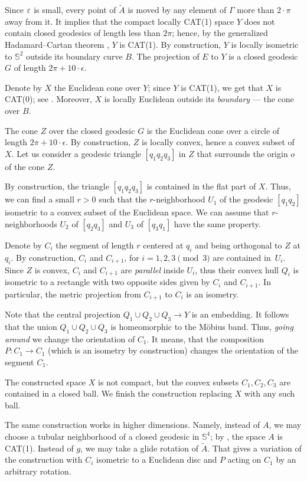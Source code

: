\documentclass[a4paper,10pt]{article}
\begin{document}
Since $\varepsilon$ is small, every point of $\tilde A$ is moved by any element of $\Gamma$ more than $2\cdot\pi$ away from it.
It implies that the compact locally CAT(1) space $Y$ does not contain closed geodesics of length less than $2\pi$;
hence, by  the generalized Hadamard--Cartan theorem \cite{AKP}, $Y$ is CAT(1).
By construction, $Y$ is locally isometric to $\mathbb{S}^2$ outside its boundary curve $B$.
The projection of $E$ to $Y$ is a closed geodesic $G$ of length $2\pi +10\cdot\epsilon$.

Denote by $X$ the Euclidean cone over $Y$;
since $Y$ is CAT(1), we get that $X$ is CAT(0); see \cite{AKP}.
Moreover, $X$ is locally Euclidean outside its \emph{boundary} --- the cone over $B$.

The cone $Z$ over the closed geodesic $G$ is  the Euclidean cone over a circle of length $2\pi +10\cdot\epsilon$. By construction,
$Z$ is locally convex, hence a convex subset of~$X$.
Let us consider a geodesic triangle
$[q_1q_2q_3]$
in $Z$ that surrounds the origin $o$ of the cone $Z$.

By construction, the triangle $[q_1q_2q_3]$ is contained in the flat part of $X$.
Thus, we can find a small $r>0$ such that the $r$-neighborhood $U_1$ of the geodesic $[q_1q_2]$ isometric to a convex subset of the Euclidean space.
We can assume that $r$-neighborhoods $U_2$ of $[q_2q_3]$ and $U_3$ of $[q_3q_1]$ have the same property.

Denote by $C_i$ the segment of length $r$ centered at $q_i$ and being orthogonal to $Z$ at $q_i$.
By construction, $C_i$ and $C_{i+1}$, for $i=1,2,3\pmod 3$   are contained in~$U_i$.
Since $Z$ is convex, $C_i$ and $C_{i+1}$ are \emph{parallel} inside $U_i$, thus their convex hull  $Q_i$ is isometric to a rectangle with two opposite sides given by $C_i$ and $C_{i+1}$.
In particular, the metric projection from $C_{i+1}$ to $C_{i}$ is an isometry.

Note that the central projection $Q_1\cup Q_2\cup Q_3\to Y$ is an embedding.
It follows that the union $Q_1\cup Q_2\cup Q_3$ is homeomorphic to the Möbius band.
Thus, \emph{going around} we change the orientation of $C_1$.
It means, that the composition $P:C_1\to C_1$ (which is an isometry by construction) changes the orientation of the 
segment $C_1$.

The constructed space $X$ is not compact, but  the convex subsets $C_1,C_2,C_3$ are contained in a closed ball.
We finish the construction replacing $X$ with any such ball.
\qeds

The same construction works in higher dimensions.
Namely, instead of $A$, we may choose a tubular neighborhood of a closed geodesic in $\mathbb{S}^4$;
by \cite{ABB-1993}, the space $A$ is CAT(1).
Instead of $g$, we may take a glide rotation of $\tilde A$.
That gives a variation of the construction with $C_i$ isometric to a Euclidean disc and $P$ acting on $C_1$ by an arbitrary rotation.

{\sloppy
\printbibliography[heading=bibintoc]
\fussy
}
\end{document}
